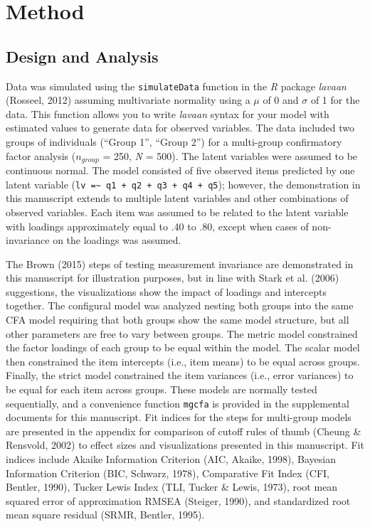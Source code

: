 \documentclass[
  man]{apa7}
\begin{document}
\hypertarget{method}{%
\section{Method}\label{method}}

\hypertarget{design-and-analysis}{%
\subsection{Design and Analysis}\label{design-and-analysis}}

Data was simulated using the \texttt{simulateData} function in the \emph{R} package \emph{lavaan} (Rosseel, 2012) assuming multivariate normality using a \(\mu\) of 0 and \(\sigma\) of 1 for the data. This function allows you to write \emph{lavaan} syntax for your model with estimated values to generate data for observed variables. The data included two groups of individuals (``Group 1'', ``Group 2'') for a multi-group confirmatory factor analysis (\(n_{group}\) = 250, \emph{N} = 500). The latent variables were assumed to be continuous normal. The model consisted of five observed items predicted by one latent variable (\texttt{lv\ =\textasciitilde{}\ q1\ +\ q2\ +\ q3\ +\ q4\ +\ q5}); however, the demonstration in this manuscript extends to multiple latent variables and other combinations of observed variables. Each item was assumed to be related to the latent variable with loadings approximately equal to .40 to .80, except when cases of non-invariance on the loadings was assumed.

The Brown (2015) steps of testing measurement invariance are demonstrated in this manuscript for illustration purposes, but in line with Stark et al. (2006) suggestions, the visualizations show the impact of loadings and intercepts together. The configural model was analyzed nesting both groups into the same CFA model requiring that both groups show the same model structure, but all other parameters are free to vary between groups. The metric model constrained the factor loadings of each group to be equal within the model. The scalar model then constrained the item intercepts (i.e., item means) to be equal across groups. Finally, the strict model constrained the item variances (i.e., error variances) to be equal for each item across groups. These models are normally tested sequentially, and a convenience function \texttt{mgcfa} is provided in the supplemental documents for this manuscript. Fit indices for the steps for multi-group models are presented in the appendix for comparison of cutoff rules of thumb (Cheung \& Rensvold, 2002) to effect sizes and visualizations presented in this manuscript. Fit indices include Akaike Information Criterion (AIC, Akaike, 1998), Bayesian Information Criterion (BIC, Schwarz, 1978), Comparative Fit Index (CFI, Bentler, 1990), Tucker Lewis Index (TLI, Tucker \& Lewis, 1973), root mean squared error of approximation RMSEA (Steiger, 1990), and standardized root mean square residual (SRMR, Bentler, 1995).
\end{document}
